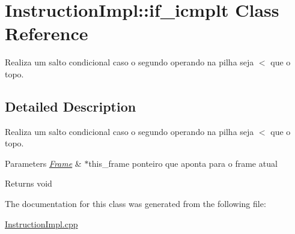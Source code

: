 \hypertarget{class_instruction_impl_1_1if__icmplt}{}\section{Instruction\+Impl\+:\+:if\+\_\+icmplt Class Reference}
\label{class_instruction_impl_1_1if__icmplt}


Realiza um salto condicional caso o segundo operando na pilha seja $<$ que o topo.  




\subsection{Detailed Description}
Realiza um salto condicional caso o segundo operando na pilha seja $<$ que o topo. 


\begin{DoxyParams}{Parameters}
{\em \hyperlink{struct_frame}{Frame}} & $\ast$this\+\_\+frame ponteiro que aponta para o frame atual \\
\hline
\end{DoxyParams}
\begin{DoxyReturn}{Returns}
void 
\end{DoxyReturn}


The documentation for this class was generated from the following file\+:\begin{DoxyCompactItemize}
\item 
\hyperlink{_instruction_impl_8cpp}{Instruction\+Impl.\+cpp}\end{DoxyCompactItemize}
